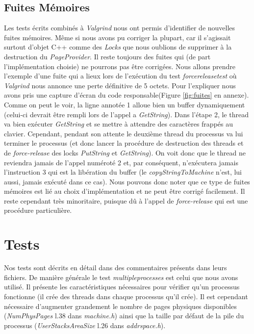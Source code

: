 \documentclass{article}
\begin{document}
\subsection{Fuites Mémoires}
Les tests écrits combinés à \textit{Valgrind} nous ont permis d'identifier de nouvelles fuites mémoires. Même si nous avons pu corriger la plupart, car il s'agissait
surtout d'objet C++ comme des \textit{Locks} que nous oublions de supprimer à la destruction du \textit{PageProvider}. Il reste toujours des fuites qui
(de part l'implémentation choisie) ne pourrons pas être corrigées. Nous allons prendre l'exemple d'une fuite qui a lieux lors de l'exécution du test \textit{forcereleasetest} où
\textit{Valgrind} nous annonce une perte définitive de 5 octets. Pour l'expliquer nous avons pris une capture d'écran du code responsable(Figure \ref{fig:fuites} en annexe).
Comme on peut le voir, la ligne annotée 1 alloue bien un buffer dynamiquement (celui-ci devrait être rempli lors de l'appel a \textit{GetString}). Dans l'étape 2, le thread va bien
exécuter \textit{GetString} et se mettre à attendre des caractères frappés au clavier. Cependant, pendant son attente le deuxième thread du processus va lui terminer le processus 
(et donc lancer la procédure de destruction des threads et de \textit{force-release} des locks \textit{PutString} et \textit{GetString}). On voit donc que le thread ne reviendra jamais de l'appel
numéroté 2 et, par conséquent, n'exécutera jamais l'instruction 3 qui est la libération du buffer (le \textit{copyStringToMachine} n'est, lui aussi, jamais exécuté dans ce cas).
Nous pouvons donc noter que ce type de fuites mémoires est lié au choix d'implémentation et ne peut être corrigé facilement. Il reste cependant très minoritaire, puisque dû à l'appel
de \textit{force-release} qui est une procédure particulière.




\section{Tests}
Nos tests sont décrits en détail dans des commentaires présents dans leurs fichiers. De manière générale le test \textit{multipleprocesses} est celui que nous avons utilisé.
Il présente les caractéristiques nécessaires pour vérifier qu'un processus fonctionne (il crée des threads dans chaque processus qu'il crée). Il est cependant nécessaire d'augmenter
grandement le nombre de pages physiques disponibles (\textit{NumPhysPages} l.38 dans \textit{machine.h}) ainsi que la taille par défaut de la pile du processus (\textit{UserStacksAreaSize} 
l.26 dans \textit{addrspace.h}).
\end{document}
